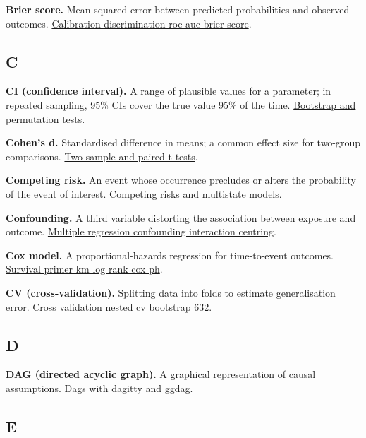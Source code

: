\documentclass[
]{article}
\begin{document}
\textbf{Brier score.} Mean squared error between predicted probabilities
and observed outcomes.
\href{../chapters/07-regression/labs/lab-calibration-discrimination-roc-auc-brier-score.Rmd}{Calibration
discrimination roc auc brier score}.

\subsection{C}\label{c}

\textbf{CI (confidence interval).} A range of plausible values for a
parameter; in repeated sampling, 95\% CIs cover the true value 95\% of
the time.
\href{../chapters/04-inferential/labs/lab-bootstrap-and-permutation-tests.Rmd}{Bootstrap
and permutation tests}.

\textbf{Cohen's d.} Standardised difference in means; a common effect
size for two-group comparisons.
\href{../chapters/04-inferential/labs/lab-two-sample-and-paired-t-tests.Rmd}{Two
sample and paired t tests}.

\textbf{Competing risk.} An event whose occurrence precludes or alters
the probability of the event of interest.
\href{../chapters/11-survival/labs/lab-competing-risks-and-multistate-models.Rmd}{Competing
risks and multistate models}.

\textbf{Confounding.} A third variable distorting the association
between exposure and outcome.
\href{../chapters/07-regression/labs/lab-multiple-regression-confounding-interaction-centring.Rmd}{Multiple
regression confounding interaction centring}.

\textbf{Cox model.} A proportional-hazards regression for time-to-event
outcomes.
\href{../chapters/11-survival/labs/lab-survival-primer-km-log-rank-cox-ph.Rmd}{Survival
primer km log rank cox ph}.

\textbf{CV (cross-validation).} Splitting data into folds to estimate
generalisation error.
\href{../chapters/13-ml/labs/lab-cross-validation-nested-cv-bootstrap-632.Rmd}{Cross
validation nested cv bootstrap 632}.

\subsection{D}\label{d}

\textbf{DAG (directed acyclic graph).} A graphical representation of
causal assumptions.
\href{../chapters/16-design/labs/lab-dags-with-dagitty-and-ggdag.Rmd}{Dags
with dagitty and ggdag}.

\subsection{E}\label{e}
\end{document}

